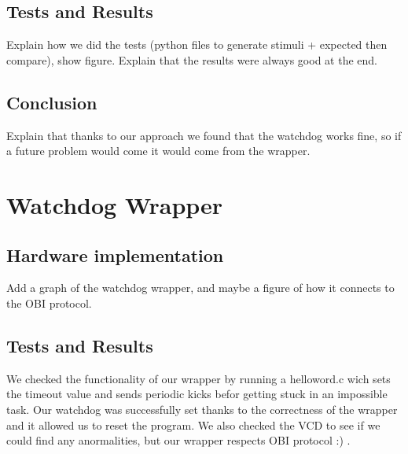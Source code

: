 \subsection{Tests and Results}
Explain how we did the tests (python files to generate stimuli + expected then compare), show figure.
Explain that the results were always good at the end.

\subsection{Conclusion}
Explain that thanks to our approach we found that the watchdog works fine, so if a future problem would come it would come from the wrapper.

\section{Watchdog Wrapper}
\subsection{Hardware implementation}
Add a graph of the watchdog wrapper, and maybe a figure of how it connects to the OBI protocol.

\subsection{Tests and Results}
We checked the functionality of our wrapper by running a helloword.c wich sets the timeout value and sends periodic kicks befor getting stuck in an impossible task. Our watchdog was successfully set thanks to the correctness of the wrapper and it allowed us to reset the program. We also checked the VCD to see if we could find any anormalities, but our wrapper respects OBI protocol :) .
